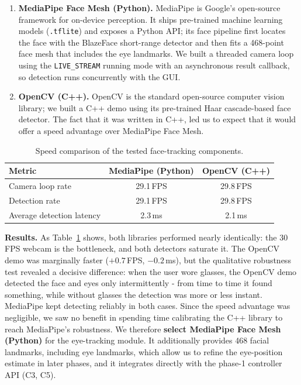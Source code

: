 \documentclass[11pt,a4paper]{article}
\begin{document}
\begin{enumerate}[itemsep=2pt,topsep=2pt]
\item \textbf{MediaPipe Face Mesh (Python).} MediaPipe is Google's
open-source framework for on-device perception. It ships pre-trained machine
learning models (\texttt{.tflite}) and exposes a Python API; its face pipeline
first locates the face with the BlazeFace short-range detector and then fits
a 468-point face mesh that includes the eye landmarks. We built a threaded
camera loop using the \texttt{LIVE\_STREAM} running mode with an asynchronous
result callback, so detection runs concurrently with the GUI.
\item \textbf{OpenCV (C++).} OpenCV is the standard open-source computer
vision library; we built a C++ demo using its pre-trained Haar cascade-based face
detector. The fact that it was written in C++, led us to expect that it would offer a speed advantage over MediaPipe Face Mesh.
\end{enumerate}

\begin{table}[H]
\centering
\caption{Speed comparison of the tested face-tracking components.}
\label{tab:speed}
\begin{tabular}{lcc}
\toprule
\textbf{Metric} & \textbf{MediaPipe (Python)} & \textbf{OpenCV (C++)} \\
\midrule
Camera loop rate          & 29.1\,FPS & 29.8\,FPS \\
Detection rate            & 29.1\,FPS & 29.8\,FPS \\
Average detection latency & 2.3\,ms   & 2.1\,ms  \\
\bottomrule
\end{tabular}
\end{table}

\noindent\textbf{Results.} As Table~\ref{tab:speed} shows, both libraries
performed nearly identically: the 30\,FPS webcam is the bottleneck, and both
detectors saturate it. The OpenCV demo was marginally faster ($+0.7$\,FPS,
$-0.2$\,ms), but the qualitative robustness test revealed a decisive
difference: when the user wore glasses, the OpenCV demo detected the face and
eyes only intermittently - from time to time it found something, while
without glasses the detection was more or less instant. MediaPipe kept
detecting reliably in both cases. Since the speed advantage was negligible, we
saw no benefit in spending time calibrating the C++ library to reach
MediaPipe's robustness.
We therefore \textbf{select MediaPipe Face Mesh (Python)} for the eye-tracking
module. It additionally provides 468 facial landmarks, including eye
landmarks, which allow us to refine the eye-position estimate in later phases,
and it integrates directly with the phase-1 controller API (C3, C5).
\end{document}
